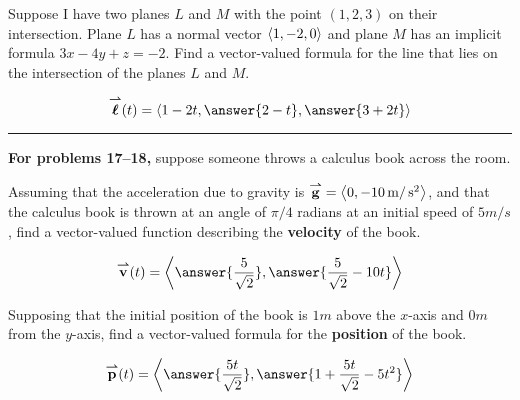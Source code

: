 \documentclass{ximera}
\author{Bart Snapp}
\begin{document}
\begin{problem}
  Suppose I have two planes $L$ and $M$ with the point $(1,2,3)$ on
  their intersection. Plane $L$ has a normal vector $\left\langle 1,-2,0\right\rangle$
  and plane $M$ has an implicit formula $3x-4y+z=-2$.  Find a
  vector-valued formula for the line that lies on the intersection of
  the planes $L$ and $M$.

  \begin{prompt}
    \[
    \vecl(t) = \vector{1-2t,\answer{2-t},\answer{3+2t}}
    \]
  \end{prompt}
  
  \vfill
\end{problem}

\hrule

\textbf{For problems 17--18,} suppose someone throws a calculus book
across the room. 

\begin{problem}
  Assuming that the acceleration due to gravity is ${\overset{\boldsymbol{\rightharpoonup}}{\mathbf{g}}} =
  \left\langle 0,-10\mathop{}\!\mathrm{m}/\mathop{}\!\mathrm{s}^2\right\rangle$, and that the calculus book is
  thrown at an angle of $\pi/4$ radians at an initial speed of
  $5\unit{m}/{s}$, find a vector-valued function describing the
  \textbf{velocity} of the book.
  \begin{prompt}
    \[
    \vec{v}(t)=\vector{\answer{\frac{5}{\sqrt{2}}}, \answer{\frac{5}{\sqrt{2}}-10t}}
    \]
  \end{prompt}

  \vfill
  
\end{problem}

\begin{problem}
  Supposing that the initial position of the book is $1\unit{m}$ above
  the $x$-axis and $0\unit{m}$ from the $y$-axis, find a vector-valued
  formula for the \textbf{position} of the book.
  \begin{prompt}
    \[
    \vec{p}(t)=\vector{\answer{\frac{5t}{\sqrt{2}}}, \answer{1+ \frac{5t}{\sqrt{2}}-5t^2}}
    \]
  \end{prompt}

  \vfill
  
\end{problem}
\end{document}
